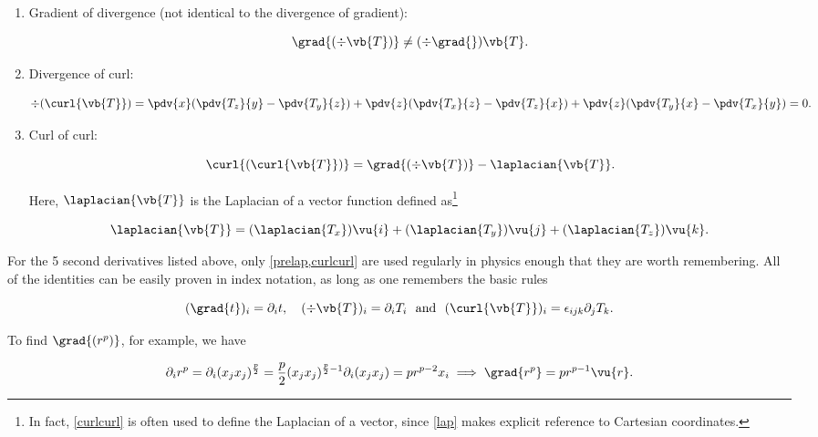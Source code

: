 \documentclass[english,a4paper,12pt]{report}
\begin{document}
\begin{enumerate}
	\item Gradient of divergence (not identical to the divergence of gradient):
		
	\begin{equation} 
		\grad{(\div{\vb{T}})} \neq (\div{\grad{} } )\vb{T}. 
	\end{equation}
		
	\item Divergence of curl:
		
	\begin{equation} 
		\div{(\curl{\vb{T}})} = \pdv{x}(\pdv{T_z}{y} - \pdv{T_y}{z}) + \pdv{z}(\pdv{T_x}{z} - \pdv{T_z}{x}) + \pdv{z}(\pdv{T_y}{x} - \pdv{T_x}{y}) = 0. \label{divcurl} 
	\end{equation}
		
	\item Curl of curl:
		
	\begin{equation} 
		\curl{(\curl{\vb{T}})} = \grad{(\div{\vb{T}})} - \laplacian{\vb{T}}. \label{curlcurl} 
	\end{equation} 
		
	Here, \(\laplacian{\vb{T}}\) is the Laplacian of a vector function defined as\footnote{In fact, \cref{curlcurl} is often used to define the Laplacian of a vector, since \cref{lap} makes explicit reference to Cartesian coordinates.}
		
	\begin{equation} 
		\laplacian{\vb{T}} = (\laplacian{T_x})\vu{i} + (\laplacian{T_y})\vu{j} + (\laplacian{T_z})\vu{k}. 
	\end{equation}	
\end{enumerate}	
	
For the 5 second derivatives listed above, only \cref{prelap,curlcurl} are used regularly in physics enough that they are worth remembering. All of the identities can be easily proven in index notation, as long as one remembers the basic rules 

\begin{equation}
	(\grad{t} )_{i} = \partial _{i}t, \quad (\div{\vb{T} } )_{i} = \partial _{i}T_{i} ~\text { and }~ (\curl{\vb{T} } )_{i} = \epsilon _{ijk}\partial _{j}T_{k}.          
\end{equation}

To find \(\grad{(r^{p}) } \), for example, we have 

\begin{equation}
	\partial _{i}r^{p} = \partial _{i}(x_{j}x_{j}  )^{\frac{p}{2} } = \frac{p}{2}(x_{j}x_{j})^{\frac{p}{2}-1 } \partial _{i}(x_{j}x_{j}  ) = pr^{p-2}x_{i} \implies \grad{r^{p} } = pr^{p-1}\vu{r} .           
\end{equation}
\end{document}
